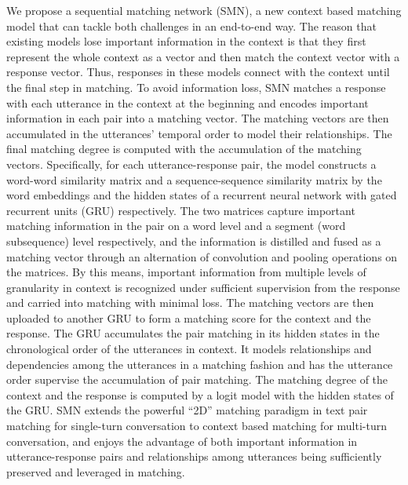 \documentclass[11pt,a4paper]{article}
\begin{document}
	We propose a sequential matching network (SMN), a new context based matching model that can tackle both challenges in an end-to-end way. The reason that existing models lose important information in the context is that they first represent the whole context as a vector and then match the context vector with a response vector. Thus, responses in these models connect with the context until the final step in matching. To avoid information loss, SMN matches a response with each utterance in the context at the beginning and encodes important information in each pair into a matching vector. The matching vectors are then accumulated in the utterances' temporal order to model their relationships. The final matching degree is computed with the accumulation of the matching vectors. Specifically, for each utterance-response pair, the model constructs a word-word similarity matrix and a sequence-sequence similarity matrix by the word embeddings and the hidden states of a recurrent neural network with gated recurrent units (GRU) \cite{chung2014empirical} respectively. The two matrices capture important matching information in the pair on a word level and a segment (word subsequence) level respectively, and the information is distilled and fused as a matching vector through an alternation of convolution and pooling operations on the matrices. By this means, important information from multiple levels of granularity in context is recognized under sufficient supervision from the response and carried into matching with minimal loss. The matching vectors are then uploaded to another GRU to form a matching score for the context and the response. The GRU accumulates the pair matching in its hidden states in the chronological order of the utterances in context. It models relationships and dependencies among the utterances in a matching fashion and has the utterance order supervise the accumulation of pair matching. The matching degree of the context and the response is computed by a logit model with the hidden states of the GRU. SMN extends the powerful ``2D'' matching paradigm in text pair matching for single-turn conversation to context based matching for multi-turn conversation, and enjoys the advantage of both important information in utterance-response pairs and relationships among utterances being sufficiently preserved and leveraged in matching. 
	
\end{document}
